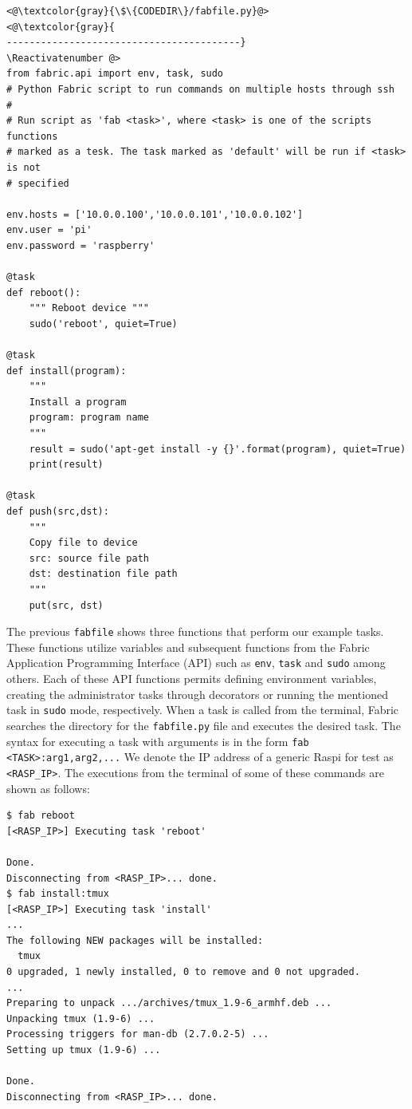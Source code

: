 \documentclass[electronics,article,accept,moreauthors,pdftex,10pt,a4paper]{mdpi}
\theoremstyle{mdpi}
\newcounter{ex}
\newcounter{re}
\theoremstyle{mdpidefinition}
\begin{document}
\Suppressnumber\begin{lstlisting}[]
<@\textcolor{gray}{\$\{CODEDIR\}/fabfile.py}@>
<@\textcolor{gray}{
-----------------------------------------}
\Reactivatenumber @>
from fabric.api import env, task, sudo
# Python Fabric script to run commands on multiple hosts through ssh
#
# Run script as 'fab <task>', where <task> is one of the scripts functions
# marked as a tesk. The task marked as 'default' will be run if <task> is not
# specified

env.hosts = ['10.0.0.100','10.0.0.101','10.0.0.102']
env.user = 'pi'
env.password = 'raspberry'

@task
def reboot():
    """ Reboot device """
    sudo('reboot', quiet=True)

@task
def install(program):
    """
    Install a program
    program: program name
    """
    result = sudo('apt-get install -y {}'.format(program), quiet=True)
    print(result)

@task
def push(src,dst):
    """
    Copy file to device
    src: source file path
    dst: destination file path
    """
    put(src, dst)

\end{lstlisting}
\FloatBarrier
\vspace{-14pt}

The previous \texttt{fabfile} shows three functions that perform our
example tasks. These functions utilize variables and subsequent functions
from the Fabric Application Programming Interface (API) such as \texttt{env}, \texttt{task} and \texttt{sudo}
among others. Each of these API functions permits defining environment
variables, creating the administrator tasks through decorators or running the
mentioned task in \texttt{sudo} mode, respectively.
When a task is called from the terminal, Fabric searches the directory for
the \texttt{fabfile.py} file and executes the desired task. The syntax for
executing a task with arguments is in the form
\texttt{fab <TASK>:arg1,arg2,...} We denote the
IP address of a generic Raspi for test as \texttt{<RASP\_IP>}.
The executions from the terminal of some of these commands are shown as
follows:

\begin{lstlisting}[]
$ fab reboot
[<RASP_IP>] Executing task 'reboot'

Done.
Disconnecting from <RASP_IP>... done.
$ fab install:tmux
[<RASP_IP>] Executing task 'install'
...
The following NEW packages will be installed:
  tmux
0 upgraded, 1 newly installed, 0 to remove and 0 not upgraded.
...
Preparing to unpack .../archives/tmux_1.9-6_armhf.deb ...
Unpacking tmux (1.9-6) ...
Processing triggers for man-db (2.7.0.2-5) ...
Setting up tmux (1.9-6) ...

Done.
Disconnecting from <RASP_IP>... done.
\end{lstlisting}
\FloatBarrier
\vspace{-5mm}
\end{document}
